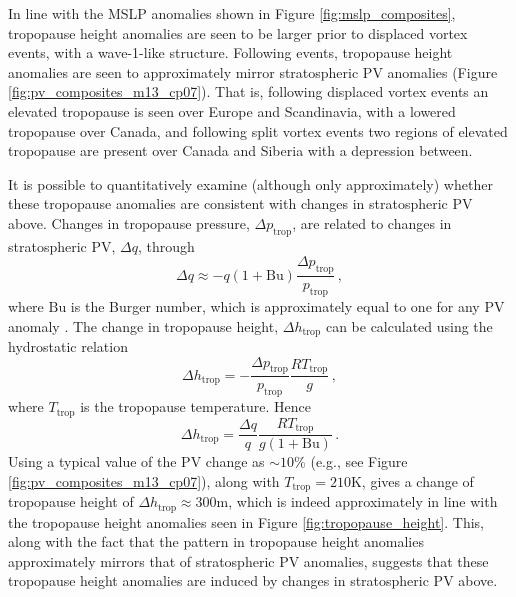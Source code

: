 In line with the MSLP anomalies shown in Figure \ref{fig:mslp_composites},
tropopause height anomalies are seen to be larger prior to displaced vortex
events, with a wave-1-like structure. Following events, tropopause height
anomalies are seen to approximately mirror stratospheric PV anomalies (Figure
\ref{fig:pv_composites_m13_cp07}). That is, following displaced vortex events an
elevated tropopause is seen over Europe and Scandinavia, with a lowered
tropopause over Canada, and following split vortex events two regions of
elevated tropopause are present over Canada and Siberia with a depression
between. 

It is possible to quantitatively examine (although only approximately) whether
these tropopause anomalies are consistent with changes in stratospheric PV
above. Changes in tropopause pressure, $\Delta p_{\mathrm{trop}}$, are related
to changes in stratospheric PV, $\Delta q$, through
\begin{equation}
\Delta q \approx -q(1+\mathrm{Bu})\frac{\Delta
  p_{\mathrm{trop}}}{p_{\mathrm{trop}}} \, , 
\label{eqn:pv_trop}
\end{equation}
where $\mathrm{Bu}$ is the Burger number, which is approximately equal to one
for any PV anomaly \citep{Ambaum2002}. The change in tropopause height,
$\Delta h_{\mathrm{trop}}$ can be calculated using the hydrostatic relation
\begin{equation}
\Delta h_{\mathrm{trop}} = -\frac{\Delta p_{\mathrm{trop}}}{p_{\mathrm{trop}}}
\frac{R T_{\mathrm{trop}}}{g} \, , 
\end{equation} 
where $T_{\mathrm{trop}}$ is the tropopause temperature. Hence
\begin{equation}
\Delta h_{\mathrm{trop}} = \frac{\Delta q}{q}
\frac{RT_{\mathrm{trop}}}{g(1+\mathrm{Bu})} \, .
\end{equation}
Using a typical value of the PV change as $\sim 10\%$ (e.g., see Figure
\ref{fig:pv_composites_m13_cp07}), along with
$T_{\mathrm{trop}} = 210\mathrm{K}$, gives a change of tropopause height of
$\Delta h_{\mathrm{trop}} \approx 300\mathrm{m}$, which is indeed approximately
in line with the tropopause height anomalies seen in Figure
\ref{fig:tropopause_height}. This, along with the fact that the pattern in
tropopause height anomalies approximately mirrors that of stratospheric PV
anomalies, suggests that these tropopause height anomalies are induced by
changes in stratospheric PV above.

